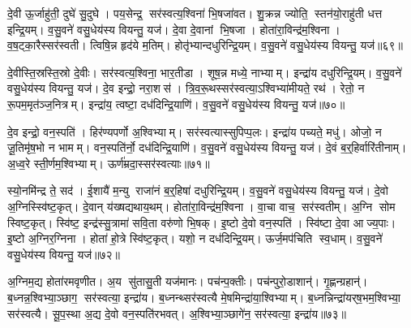 दे॒वी ऊ॒र्जाहु॑ती॒ दुघे॑ सु॒दुघे। पय॒सेन्द्र॒ सर॑स्वत्य॒श्विना॑ भि॒षजा॑वत। शु॒क्रन्न ज्योति॒ स्तन॑यो॒राहु॑ती धत्त इन्द्रि॒यम्। व॒सु॒वने॑ वसु॒धेय॑स्य वियन्तु॒ यज॑। दे॒वा दे॒वानां भि॒षजा। होता॑रा॒विन्द्र॑म॒श्विना। व॒ष॒ट्का॒रैस्सर॑स्वती। त्विषि॒न्न हृद॑ये म॒तिम्। होतृ॑भ्यान्दधुरिन्द्रि॒यम्। व॒सु॒वने॑ वसु॒धेय॑स्य वियन्तु॒ यज॑॥६९॥

दे॒वीस्ति॒स्रस्ति॒स्रो दे॒वीः। सर॑स्वत्य॒श्विना॒ भार॒तीडा। शूष॒न्न मध्ये॒ नाभ्याम्। इन्द्रा॑य दधुरिन्द्रि॒यम्। व॒सु॒वने॑ वसु॒धेय॑स्य वियन्तु॒ यज॑। दे॒व इन्द्रो॒ नरा॒शस॑। त्रि॒व॒रू॒थस्सर॑स्वत्या॒ऽश्विभ्या॑मीयते॒ रथ॑। रेतो॒ न रू॒पम॒मृत॑ञ्ज॒नित्रम्। इन्द्रा॑य॒ त्वष्टा॒ दध॑दिन्द्रि॒याणि॑। व॒सु॒वने॑ वसु॒धेय॑स्य वियन्तु॒ यज॑॥७०॥

दे॒व इन्द्रो॒ वन॒स्पति॑। हिर॑ण्यपर्णो अ॒श्विभ्याम्। सर॑स्वत्यास्सुपिप्प॒लः। इन्द्रा॑य पच्यते॒ मधु॑। ओजो॒ न जू॒तिमृ॑ष॒भो न भामम्। वन॒स्पति॑र्नो॒ दध॑दिन्द्रि॒याणि॑। व॒सु॒वने॑ वसु॒धेय॑स्य वियन्तु॒ यज॑। दे॒वं ब॒र्॒हिर्वारि॑तीनाम्। अ॒ध्व॒रे स्ती॒र्णम॒श्विभ्याम्। ऊर्ण॑म्रदा॒स्सर॑स्वत्याः॥७१॥

स्यो॒नमि॑न्द्र ते॒ सद॑। ई॒शायै॑ म॒न्यु राजा॑नं ब॒र्॒हिषा॑ दधुरिन्द्रि॒यम्। व॒सु॒वने॑ वसु॒धेय॑स्य वियन्तु॒ यज॑। दे॒वो अ॒ग्निस्स्वि॑ष्ट॒कृत्। दे॒वान् य॑ख्षद्यथाय॒थम्। होता॑रा॒विन्द्र॑म॒श्विना। वा॒चा वाच॒ सर॑स्वतीम्। अ॒ग्नि सोम स्विष्ट॒कृत्। स्वि॑ष्ट॒ इन्द्र॑स्सु॒त्रामा॑ सवि॒ता वरु॑णो भि॒षक्। इ॒ष्टो दे॒वो वन॒स्पति॑। स्वि॑ष्टा दे॒वा आज्य॒पाः। इ॒ष्टो अ॒ग्निर॒ग्निना। होता॑ हो॒त्रे स्वि॑ष्ट॒कृत्। यशो॒ न दध॑दिन्द्रि॒यम्। ऊर्ज॒मप॑चिति स्व॒धाम्। व॒सु॒वने॑ वसु॒धेय॑स्य वियन्तु॒ यज॑॥७२॥\anuvakamend[द्वारो॑ दधुरिन्द्रि॒यव्वँ॑सु॒वने॑ वसु॒धेय॑स्य वियन्तु॒ यज॒ जोष्ट्रीभ्यान्दधुरिन्द्रि॒यव्वँ॑सु॒वने॑ वसु॒धेय॑स्य वियन्तु॒ यज॒ होतृ॑भ्यान्दधुरिन्द्रि॒यव्वँ॑सु॒वने॑ वसु॒धेय॑स्य वियन्तु॒ यजेन्द्रि॒याणि॑ वसु॒वने॑ वसु॒धेय॑स्य वियन्तु॒ यज॒ सर॑स्वत्या॒ वन॒स्पति॒ष्षट्च॑ (दे॒वं ब॒र्॒हिर्दे॒वीर्द्वारो॑ दे॒वी उ॒षासा॑व॒श्विना॑ दे॒वी जोष्ट्री॑ दे॒वी ऊ॒र्जाहु॑ती दे॒वा दे॒वानां भि॒षजा॑ वषट्का॒रैर्दे॒वीस्ति॒स्रस्ति॒स्रो दे॒वीर्दे॒व इन्द्रो॒ नरा॒शसो॑ दे॒व इन्द्रो॒ वन॒स्पति॑र्दे॒वं ब॒र्॒हिर्वारि॑तीनान्दे॒वो अ॒ग्निस्स्वि॑ष्ट॒कृद्दे॒वान्। स॒मिधा॒ऽग्निन्दे॒वं ब॒र्॒हिस्सर॑स्वत्य॒श्विना॒ सर्व॑ वियन्तु। द्वार॑स्ति॒स्रस्सर्व॑वियन्तु। अ॒ज इन्द्र॒मोजो॒ऽग्निं पर॒स्सर॑स्वतीम्। नक्तं॒ पूर्व॒स्सर॑स्वति। अ॒न्यत्र॒ सर॑स्वती। भि॒षक्पूर्व॑न्दुह इन्द्रि॒यम्। अ॒न्यत्र॑ दधुरिन्द्रि॒यम्। सौ॒त्रा॒म॒ण्या सु॑तासु॒ती। अ॒ञ्जन्त्य॒यय्यँज॑मानः ॥ )]

अ॒ग्निम॒द्य होता॑रमवृणीत। अ॒य सु॑तासु॒ती यज॑मानः। पच॑न्प॒क्तीः। पच॑न्पुरो॒डाशान्॑। गृ॒ह्णन्ग्रहान्॑। ब॒ध्नन्न॒श्विभ्या॒ञ्छाग॒ सर॑स्वत्या॒ इन्द्रा॑य। ब॒ध्नन्थ्सर॑स्वत्यै मे॒षमिन्द्रा॑या॒श्विभ्याम्। ब॒ध्नन्निन्द्रा॑यर्‌ष॒भम॒श्विभ्या॒ सर॑स्वत्यै। सू॒प॒स्था अ॒द्य दे॒वो वन॒स्पति॑रभवत्। अ॒श्विभ्या॒ञ्छागे॑न॒ सर॑स्वत्या॒ इन्द्रा॑य॥७३॥

